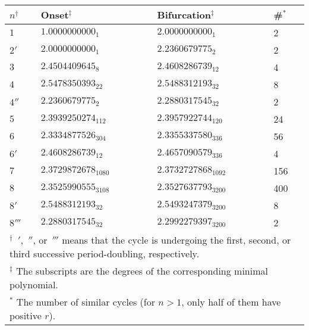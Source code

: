 \documentclass{ws-ijbc}
\begin{document}
\begin{table}[h]\footnotesize
{
\begin{tabular}{l l l l}
\hline
  $n^\dagger$
& Onset$^\ddagger$
& Bifurcation$^\ddagger$
& \#$^*$ \\
\hline
$1$     & $1.0000000000_1$      &  $2.0000000000_1$       & 2   \\
$2'$    & $2.0000000000_1$      &  $2.2360679775_2$       & 2   \\
$3$     & $2.4504409645_{8}$    &  $2.4608286739_{12}$    & 4   \\
$4$     & $2.5478350393_{22}$   &  $2.5488312193_{32}$    & 8   \\
$4''$   & $2.2360679775_{2}$    &  $2.2880317545_{32}$    & 2   \\
$5$     & $2.3939250274_{112}$  &  $2.3957922744_{120}$   & 24  \\
$6$     & $2.3334877526_{304}$  &  $2.3355337580_{336}$   & 56  \\
$6'$    & $2.4608286739_{12}$   &  $2.4657090579_{336}$   & 4   \\
$7$     & $2.3729872678_{1080}$ &  $2.3732727868_{1092}$  & 156 \\
$8$     & $2.3525990555_{3108}$ &  $2.3527637793_{3200}$  & 400 \\
$8'$    & $2.5488312193_{32}$   &  $2.5493247379_{3200}$  & 8   \\
$8'''$  & $2.2880317545_{32}$   &  $2.2992279397_{3200}$  & 2   \\
\hline
\multicolumn{4}{p{\linewidth}}{
$^\dagger$
  $\,'$, $\,''$, or $\,'''$ means that the cycle is undergoing
    the first, second, or third successive period-doubling, respectively.
} \\
\multicolumn{4}{p{\linewidth}}{
$^\ddagger$
  The subscripts are the degrees of the corresponding minimal polynomial.
} \\
\multicolumn{4}{p{\linewidth}}{
$^*$
  The number of similar cycles
    (for $n > 1$, only half of them have positive $r$).
} \\
\hline
\end{tabular}
\label{tab:crval}
}
\end{table}
\end{document}
